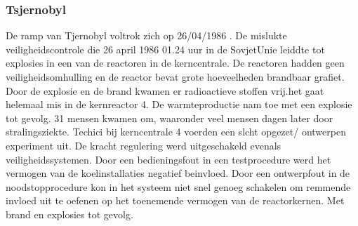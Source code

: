 \documentclass{article}
\begin{document}
	\subsubsection{Tsjernobyl}
	\newline \indent De ramp van Tjernobyl voltrok zich op 26/04/1986 \cite{INSAVienna1992Chernobyl}.
	De mislukte veiligheidscontrole die 26 april 1986 01.24 uur in de SovjetUnie leiddte tot explosies in een van de reactoren in de kerncentrale. De reactoren hadden geen veiligheidsomhulling en de reactor bevat grote hoeveelheden brandbaar grafiet. Door de explosie en de brand kwamen er radioactieve stoffen vrij.het gaat helemaal mis in de kernreactor 4. De warmteproductie nam  toe met een explosie tot gevolg. 31 mensen kwamen om, waaronder veel mensen dagen later door stralingsziekte.
	Techici bij kerncentrale 4 voerden een slcht opgezet/ ontwerpen experiment uit. De  kracht regulering werd uitgeschakeld evenals veiligheidssystemen. 
	Door een bedieningsfout in een testprocedure werd het vermogen van de koelinstallaties negatief beinvloed. Door een ontwerpfout in de noodstopprocedure kon in het systeem niet snel genoeg schakelen om remmende invloed uit te oefenen op het toenemende vermogen van de reactorkernen. Met brand en explosies tot gevolg.
	\cite{rivmTjernobyl}
	\cite{andereTijdenTjernobyl}
	\cite{kingskey19042022tjernobyl}
	\cite{erikbork26042023reactor4}
	\cite{nosTjernobyl30jaarlater}
\end{document}
